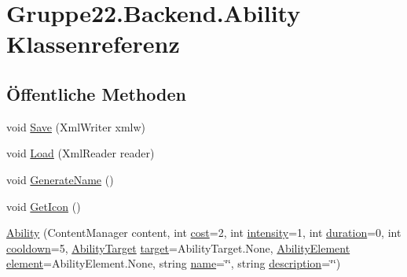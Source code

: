 \hypertarget{class_gruppe22_1_1_backend_1_1_ability}{\section{Gruppe22.\-Backend.\-Ability Klassenreferenz}
\label{class_gruppe22_1_1_backend_1_1_ability}
}
\subsection*{Öffentliche Methoden}
\begin{DoxyCompactItemize}
\item 
void \hyperlink{class_gruppe22_1_1_backend_1_1_ability_a210e90c69a90ce45b8d1d642c9d11221}{Save} (Xml\-Writer xmlw)
\item 
void \hyperlink{class_gruppe22_1_1_backend_1_1_ability_a33373ce962eb402cdeff95b81cfae7a3}{Load} (Xml\-Reader reader)
\item 
void \hyperlink{class_gruppe22_1_1_backend_1_1_ability_a663457451c5e71c31f4048d6bd0d9514}{Generate\-Name} ()
\item 
void \hyperlink{class_gruppe22_1_1_backend_1_1_ability_ae790c08b2a22597fda3e2639db310db5}{Get\-Icon} ()
\item 
\hyperlink{class_gruppe22_1_1_backend_1_1_ability_a6af6ea05adee5c392b0cd0c83a8a74cf}{Ability} (Content\-Manager content, int \hyperlink{class_gruppe22_1_1_backend_1_1_ability_ab2f4f4b75213c665106df63903ccfe8c}{cost}=2, int \hyperlink{class_gruppe22_1_1_backend_1_1_ability_a1d46b2b7c4ef3a68baaecdd760cd1e95}{intensity}=1, int \hyperlink{class_gruppe22_1_1_backend_1_1_ability_a770e679c16231ff78f2ae8cc224c135f}{duration}=0, int \hyperlink{class_gruppe22_1_1_backend_1_1_ability_a9a046660470ca60c301cf0b5b8f74b5a}{cooldown}=5, \hyperlink{namespace_gruppe22_1_1_backend_a76255be55e4f31a7f4380aa4570b7531}{Ability\-Target} \hyperlink{class_gruppe22_1_1_backend_1_1_ability_aa77fd7c42e2d1396cd7930c6afdc4fc0}{target}=Ability\-Target.\-None, \hyperlink{namespace_gruppe22_1_1_backend_a313ed67a4abf2c938a5930323a3d6f49}{Ability\-Element} \hyperlink{class_gruppe22_1_1_backend_1_1_ability_a0025d149e70655162484fd013d6b4aa5}{element}=Ability\-Element.\-None, string \hyperlink{class_gruppe22_1_1_backend_1_1_ability_a64ef394368abef87c79e24d6383f0e41}{name}=\char`\"{}\char`\"{}, string \hyperlink{class_gruppe22_1_1_backend_1_1_ability_a98e874a3e5d992f0ae8e24e2a92dbd7e}{description}=\char`\"{}\char`\"{})
\end{DoxyCompactItemize}
